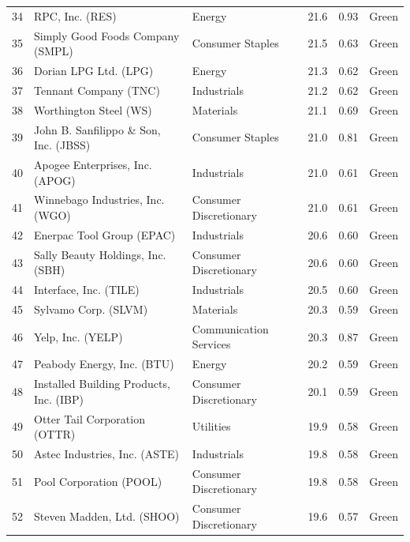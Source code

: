 \documentclass[11pt,a4paper]{article}
\begin{document}
{\begin{longtable}{r p{4.6cm} p{3cm} r r l}
34 & RPC, Inc. (RES) & Energy & 21.6 & 0.93 & \cellcolor[HTML]{C6EFCE}Green \\
35 & Simply Good Foods Company (SMPL) & Consumer Staples & 21.5 & 0.63 & \cellcolor[HTML]{C6EFCE}Green \\
36 & Dorian LPG Ltd. (LPG) & Energy & 21.3 & 0.62 & \cellcolor[HTML]{C6EFCE}Green \\
37 & Tennant Company (TNC) & Industrials & 21.2 & 0.62 & \cellcolor[HTML]{C6EFCE}Green \\
38 & Worthington Steel (WS) & Materials & 21.1 & 0.69 & \cellcolor[HTML]{C6EFCE}Green \\
39 & John B. Sanfilippo \& Son, Inc. (JBSS) & Consumer Staples & 21.0 & 0.81 & \cellcolor[HTML]{C6EFCE}Green \\
40 & Apogee Enterprises, Inc. (APOG) & Industrials & 21.0 & 0.61 & \cellcolor[HTML]{C6EFCE}Green \\
41 & Winnebago Industries, Inc. (WGO) & Consumer Discretionary & 21.0 & 0.61 & \cellcolor[HTML]{C6EFCE}Green \\
42 & Enerpac Tool Group (EPAC) & Industrials & 20.6 & 0.60 & \cellcolor[HTML]{C6EFCE}Green \\
43 & Sally Beauty Holdings, Inc. (SBH) & Consumer Discretionary & 20.6 & 0.60 & \cellcolor[HTML]{C6EFCE}Green \\
44 & Interface, Inc. (TILE) & Industrials & 20.5 & 0.60 & \cellcolor[HTML]{C6EFCE}Green \\
45 & Sylvamo Corp. (SLVM) & Materials & 20.3 & 0.59 & \cellcolor[HTML]{C6EFCE}Green \\
46 & Yelp, Inc. (YELP) & Communication Services & 20.3 & 0.87 & \cellcolor[HTML]{C6EFCE}Green \\
47 & Peabody Energy, Inc. (BTU) & Energy & 20.2 & 0.59 & \cellcolor[HTML]{C6EFCE}Green \\
48 & Installed Building Products, Inc. (IBP) & Consumer Discretionary & 20.1 & 0.59 & \cellcolor[HTML]{C6EFCE}Green \\
49 & Otter Tail Corporation (OTTR) & Utilities & 19.9 & 0.58 & \cellcolor[HTML]{C6EFCE}Green \\
50 & Astec Industries, Inc. (ASTE) & Industrials & 19.8 & 0.58 & \cellcolor[HTML]{C6EFCE}Green \\
51 & Pool Corporation (POOL) & Consumer Discretionary & 19.8 & 0.58 & \cellcolor[HTML]{C6EFCE}Green \\
52 & Steven Madden, Ltd. (SHOO) & Consumer Discretionary & 19.6 & 0.57 & \cellcolor[HTML]{C6EFCE}Green \\

\end{longtable}}
\end{document}
